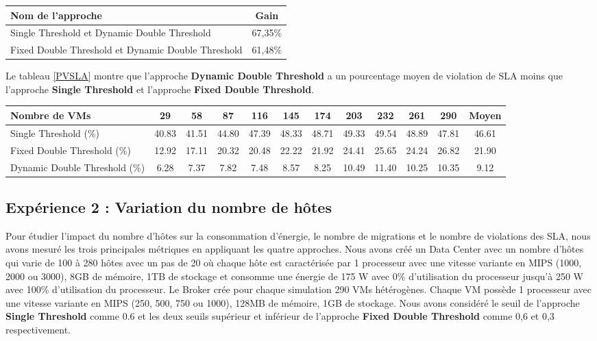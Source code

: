 \begin{onehalfspace}
\begin{center}
{\scriptsize   \begin{tabular}{|p{3.5cm}|c|}
\hline
      \centering      Nom de l’approche&  Gain\\
\hline
      \centering      Single Threshold et Dynamic Double Threshold&  67,35\%\\
\hline
      \centering      Fixed Double Threshold et Dynamic Double Threshold&  61,48\%\\
\hline
\end{tabular}}
\label{GAIN3}
\end{center}
Le tableau \ref{PVSLA} montre que l’approche \textbf{Dynamic Double Threshold} a un pourcentage moyen de violation de SLA moins que l’approche \textbf{Single Threshold} et l’approche \textbf{Fixed Double Threshold}.
\begin{center}
{\scriptsize   \begin{tabular}{|p{2.5cm}|c|c|c|c|c|c|c|c|c|c|c|}
\hline
      \centering     Nombre de VMs &  29& 58& 87& 116& 145& 174& 203& 232& 261& 290& Moyen\\
\hline
      \centering      Single Threshold (\%)&  40.83& 41.51& 44.80& 47.39& 48.33& 48.71& 49.33& 49.54& 48.89& 47.81& 46.61\\
\hline
      \centering      Fixed Double Threshold (\%)&  12.92& 17.11& 20.32& 20.48& 22.22& 21.92& 24.41& 25.65& 24.24& 26.82& 21.90\\
\hline
      \centering     Dynamic Double Threshold (\%)&  6.28& 7.37& 7.82& 7.48& 8.57& 8.25& 10.49& 11.40& 10.25& 10.35& 9.12\\
\hline
\end{tabular}}
\label{PVSLA}
\end{center}

\subsection{Expérience 2 : Variation du nombre de hôtes}

Pour étudier l’impact du nombre d’hôtes sur la consommation d’énergie, le nombre de migrations et le nombre de violations des SLA, nous avons mesuré les trois principales métriques en appliquant les quatre approches. Nous avons créé un Data Center avec un nombre d’hôtes qui varie de 100 à 280 hôtes avec un pas de 20 où chaque hôte est caractérisée par 1 processeur avec une vitesse variante en MIPS (1000, 2000 ou 3000), 8GB de mémoire, 1TB de stockage et consomme une énergie de 175 W avec 0\% d’utilisation du processeur jusqu’à 250 W avec 100\% d’utilisation du processeur. Le Broker crée pour chaque simulation 290 VMs hétérogènes. Chaque VM possède 1 processeur avec une vitesse variante en MIPS (250, 500, 750 ou 1000), 128MB de mémoire, 1GB de stockage. Nous avons considéré le seuil de l’approche \textbf{Single Threshold} comme 0.6 et les deux seuils supérieur et inférieur de l’approche \textbf{Fixed Double Threshold} comme 0,6 et 0,3 respectivement.



\end{onehalfspace}
